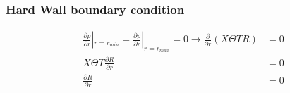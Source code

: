 








\subsubsection{Hard Wall boundary condition}
\begin{align*}
    \frac{\partial p}{\partial r}|_{r = r_{min}}  =\frac{\partial p}{\partial r}|_{r = r_{max}} = 0 \rightarrow 
    \frac{\partial}{\partial r} \left( X\Theta T R \right) &= 0 \\
    X \Theta T\frac{\partial R}{\partial r}  &= 0 \\
    \frac{\partial R}{\partial r}  &= 0 
\end{align*}

